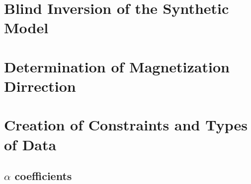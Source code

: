 \section{Blind Inversion of the Synthetic Model}
\label{sec:Blind Inversion of the Synthetic Model:TKC}


\section{Determination of Magnetization Dirrection}
\label{sec:Determination of Magnetization Dirrection}
%
%
%
%
%

\section{Creation of Constraints and Types of Data}
\label{sec:Creation of Constraints:TKC}




\subsection{$\alpha$ coefficients}
\label{sec:alpha coefficients:TKC}


